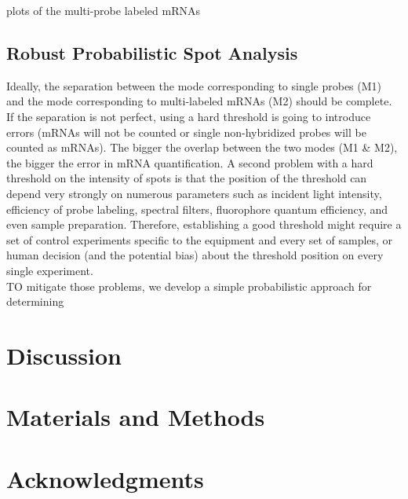 \documentclass[10pt]{article}
\begin{document}
\begin{spacing}{1.5}
plots of the multi-probe labeled mRNAs

\subsection*{Robust Probabilistic Spot Analysis}
Ideally, the separation between the mode corresponding to single probes (M1) and the mode corresponding to multi-labeled mRNAs (M2) should be complete. If the separation is not perfect, using a hard threshold is going to introduce errors (mRNAs will not be counted or single non-hybridized probes will be counted as mRNAs). The bigger the overlap between the two modes (M1 \& M2), the bigger the error in mRNA quantification. A second problem with a hard threshold on the intensity of spots is that the position of the threshold can depend very strongly on numerous parameters such as incident light intensity, efficiency of probe labeling, spectral filters, fluorophore quantum efficiency, and even sample preparation. Therefore, establishing a good threshold might require a set of control experiments specific to the equipment and  every set of samples, or human decision (and the potential bias) about the threshold position on every single experiment. \\

TO mitigate those problems, we develop a simple probabilistic approach for determining    


\section*{Discussion}

\section*{Materials and Methods}





\section*{Acknowledgments}





\end{spacing}
\end{document}
